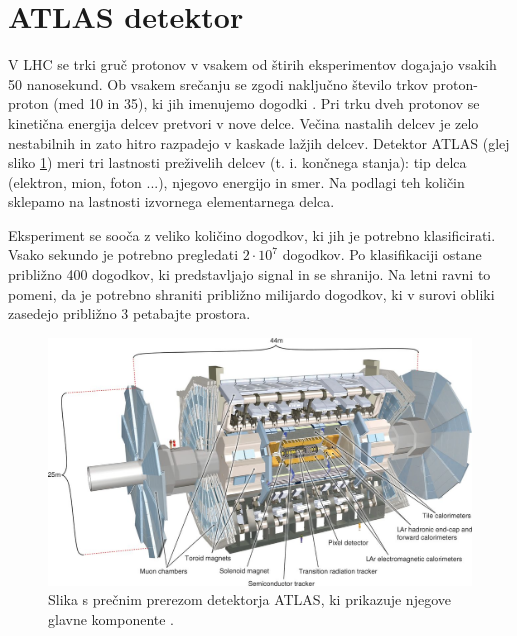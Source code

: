 \documentclass[11pt,a4paper,openany]{book}
\begin{document}
\section{ATLAS detektor}
\label{sec:atlasdetector}
V LHC se trki gruč protonov v vsakem od štirih eksperimentov dogajajo vsakih 50 nanosekund. Ob vsakem srečanju se zgodi naključno število trkov proton-proton (med 10 in 35), ki jih imenujemo dogodki \cite{ChallengeDoc}. Pri trku dveh protonov se kinetična energija delcev pretvori v nove delce. Večina nastalih delcev je zelo nestabilnih in zato hitro razpadejo v kaskade lažjih delcev. Detektor ATLAS (glej sliko \ref{detektoratlas}) meri tri lastnosti preživelih delcev (t. i. končnega stanja): tip delca (elektron, mion, foton ...), njegovo energijo in smer. Na podlagi teh količin sklepamo na lastnosti izvornega elementarnega delca.

Eksperiment se sooča z veliko količino dogodkov, ki jih je potrebno klasificirati. Vsako sekundo je potrebno pregledati $2 \cdot 10^7$ dogodkov. Po klasifikaciji ostane približno 400 dogodkov, ki predstavljajo signal in se shranijo. Na letni ravni to pomeni, da je potrebno shraniti približno milijardo dogodkov, ki v surovi obliki zasedejo približno 3 petabajte prostora.

\begin{figure}[ht]
	\includegraphics[width=16.0cm]{physics/atlas_detector.jpg}
	
	\caption{Slika s prečnim prerezom detektorja ATLAS, ki prikazuje njegove glavne komponente \cite{AadScience2012}.  }
	\label{detektoratlas}
\end{figure}
\end{document}
